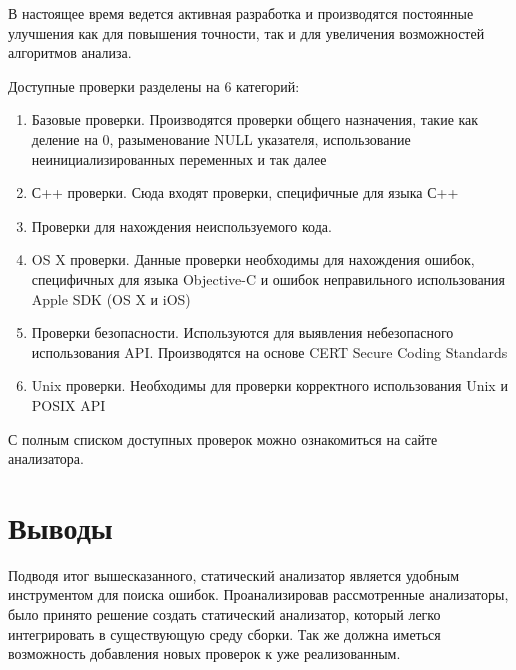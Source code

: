 В настоящее время ведется активная разработка и производятся постоянные улучшения как для повышения точности, 
так и для увеличения возможностей алгоритмов анализа. 

Доступные проверки разделены на 6 категорий: 
\begin{enumerate}
	\item Базовые проверки. Производятся проверки общего назначения, такие как деление на 0, 
разыменование NULL указателя, использование неинициализированных переменных и так далее
	\item С++ проверки. Сюда входят проверки, специфичные для языка С++
	\item Проверки для нахождения неиспользуемого кода.
	\item OS X проверки. Данные проверки необходимы для нахождения ошибок, специфичных для 
языка Objective-C и ошибок неправильного использования Apple SDK (OS X и iOS)
	\item Проверки безопасности. Используются для выявления небезопасного использования API. 
Производятся на основе CERT Secure Coding Standards 
	\item Unix проверки. Необходимы для проверки корректного использования Unix и POSIX API
\end{enumerate}
С полным списком доступных проверок можно ознакомиться на сайте анализатора\cite{clCheck}.

\section{Выводы}
Подводя итог вышесказанного, статический анализатор является удобным инструментом для поиска
ошибок. Проанализировав рассмотренные анализаторы, было принято решение создать статический анализатор,
который легко интегрировать в существующую среду сборки. Так же должна иметься возможность добавления новых 
проверок к уже реализованным.
